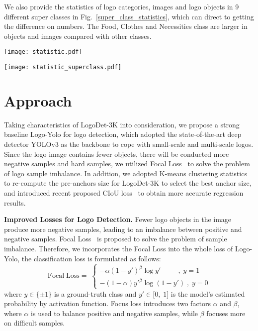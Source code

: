 \documentclass[journal]{IEEEtran}
\begin{document}
We also provide the statistics of logo categories, images and logo objects in 9 different super classes in Fig.~\ref{super_class_statistics}, which can direct to getting the difference on numbers. The Food, Clothes and Necessities class are larger in objects and images compared with other classes.

\begin{figure*}[!t]
	\centering
	\texttt{[image: statistic.pdf]}
	\caption{The detailed statistics of LogoDet-3K about Image and object distribution in per category, the number of objects in per image and object size in per image.}
	\label{statistic}
\end{figure*}
\begin{figure*}[!t]
	\centering
	\texttt{[image: statistic\_superclass.pdf]}
	\caption{Distributions of categories, images and objects from LogoDet-3K on super-classes.}
	\label{super_class_statistics}
\end{figure*}





\section{Approach}
Taking characteristics of LogoDet-3K into consideration, we propose a strong baseline Logo-Yolo for logo detection, which  adopted the state-of-the-art deep detector YOLOv3 as the backbone to cope with small-scale  and multi-scale logos. Since the logo image contains fewer objects, there will be conducted more negative samples and hard samples, we utilized Focal Loss~\cite{Tsung2017Focal} to solve the problem of logo sample imbalance. In addition, we adopted K-means clustering statistics to re-compute the pre-anchors size for LogoDet-3K to select the best anchor size, and introduced recent proposed CIoU loss~\cite{Zheng2020Distance} to obtain more accurate regression results.

\textbf{Improved Losses for Logo Detection.} Fewer logo objects in the image produce more negative samples, leading to an imbalance between positive and negative samples. Focal Loss~\cite{Tsung2017Focal} is proposed  to solve the problem of sample imbalance. Therefore, we incorporates the Focal Loss into the whole loss of Logo-Yolo, the classification loss is formulated as follows:
\begin{equation}
\mathrm{Focal\;Loss}=\;\left\{\begin{array}{l}-\alpha{(1-y')}^\beta\log y'\;\;\;\;\;\;\;\;\;,\;y=1\\-(1-\alpha)y'^\beta\log(1-y')\;,\;y=0\end{array}\right.
\end{equation}
where $y\in\{\pm1\}$ is a ground-truth class and $y'\in\lbrack0,\;1\rbrack$ is the model's estimated probability by activation function. Focus loss introduces two factors $\alpha$ and $\beta$, where $\alpha$ is used to balance positive and negative samples, while $\beta$  focuses more on difficult samples.
\end{document}
